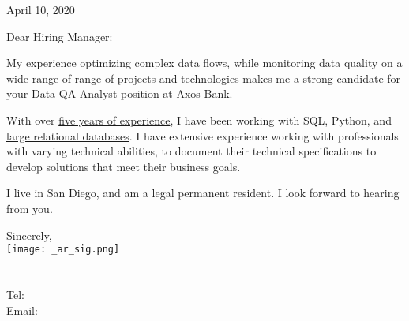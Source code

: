 \documentclass[letterpaper]{article}
\newcommand{\CVjobTitle}{Data QA Analyst}
\newcommand{\CVcompany}{Axos Bank}
\newcommand{\impt}[1]{\uline{#1}}
\begin{document}
\large

\null\hfill April 10, 2020
\vspace{1em}

Dear Hiring Manager:

My experience optimizing complex data flows, while monitoring data quality on a
wide range of range of projects and technologies makes me a strong candidate for
your \impt{\CVjobTitle} position at \CVcompany.

With over \impt{five years of experience}, I have been working with SQL, Python,
and \impt{large relational databases}. I have extensive experience working with
professionals with varying technical abilities, to document their technical
specifications to develop solutions that meet their business goals.



I live in San Diego, and am a legal permanent resident.  
I look forward to hearing from you.  


Sincerely,\\
\hspace{1em} \texttt{[image: \_ar\_sig.png]} \\
\CVname \\
\small
\CVaddresswrap \\
Tel: \CVphone \\
Email: \CVemail
\end{document}
